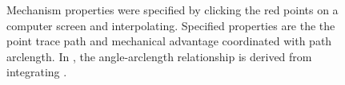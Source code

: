 \documentclass[journal]{IEEEtran}
\begin{document}
\begin{figure}[!t]
\centering
{}
\hfil
{}
\hfil
{}
\caption{Mechanism properties were specified by clicking the red points on a computer screen and interpolating.  Specified properties are the \protect{} the point trace path and \protect{} mechanical advantage coordinated with path arclength.  In \protect{}, the angle-arclength relationship is derived from integrating \protect{}.}
\label{clickspec}
\end{figure}
\end{document}
